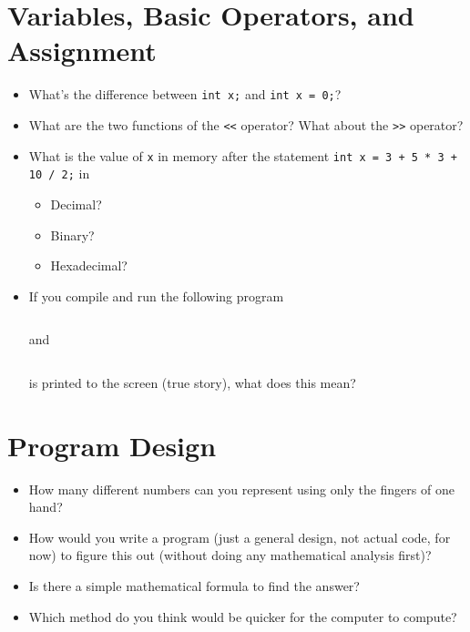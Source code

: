 \documentclass[12pt,letterpaper]{article}
\begin{document}
\filbreak
\section*{Variables, Basic Operators, and Assignment}

\begin{itemize}

  \item What's the difference between
    \texttt{int x;} and \texttt{int x = 0;}?

  \item What are the two functions of the \texttt{<<} operator?  What
    about the \texttt{>>} operator?

  \item What is the value of \texttt{x} in memory after the statement
    \texttt{int x = 3 + 5 * 3 + 10 / 2;} in
    \begin{itemize}
      \item Decimal?
      \item Binary?
      \item Hexadecimal?
    \end{itemize}

  \item If you compile and run the following program

    \inputminted{cpp}{address-of-x.cpp}

    and

    \inputminted{cpp}{address-of-x.cpp.txt}
    
    is printed to the screen (true story), what does this mean?

\end{itemize}


\filbreak
\section*{Program Design}
\begin{itemize}

  \item How many different numbers can you represent using only the fingers of
    one hand?

  \item How would you write a program (just a general design, not actual code,
    for now) to figure this out (without doing any mathematical analysis
    first)?

  \item Is there a simple mathematical formula to find the answer?

  \item Which method do you think would be quicker for the computer to compute?

\end{itemize}
\end{document}
